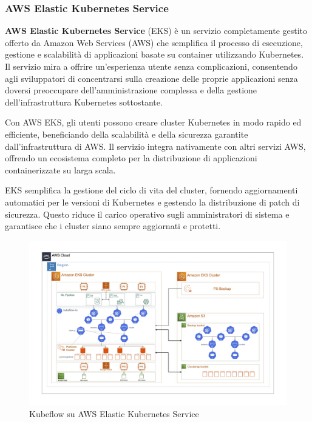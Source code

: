 \subsubsection{AWS Elastic Kubernetes Service}

\textbf{AWS Elastic Kubernetes Service} (EKS) è un servizio completamente gestito offerto da Amazon Web Services (AWS) che semplifica il processo di esecuzione, gestione e scalabilità di applicazioni basate su container utilizzando Kubernetes. Il servizio mira a offrire un'esperienza utente senza complicazioni, consentendo agli sviluppatori di concentrarsi sulla creazione delle proprie applicazioni senza doversi preoccupare dell'amministrazione complessa e della gestione dell'infrastruttura Kubernetes sottostante.

Con AWS EKS, gli utenti possono creare cluster Kubernetes in modo rapido ed efficiente, beneficiando della scalabilità e della sicurezza garantite dall'infrastruttura di AWS. Il servizio integra nativamente con altri servizi AWS, offrendo un ecosistema completo per la distribuzione di applicazioni containerizzate su larga scala.

EKS semplifica la gestione del ciclo di vita del cluster, fornendo aggiornamenti automatici per le versioni di Kubernetes e gestendo la distribuzione di patch di sicurezza. Questo riduce il carico operativo sugli amministratori di sistema e garantisce che i cluster siano sempre aggiornati e protetti.

\begin{figure}[h]
    \centering
    \includegraphics[width=\linewidth]{figures/ch3/kubeflow-aws.jpeg}
    \caption[Kubeflow su AWS Elastic Kubernetes Service]{Kubeflow su AWS Elastic Kubernetes Service}
    \label{fig:cha3:kf-aws}
\end{figure}

